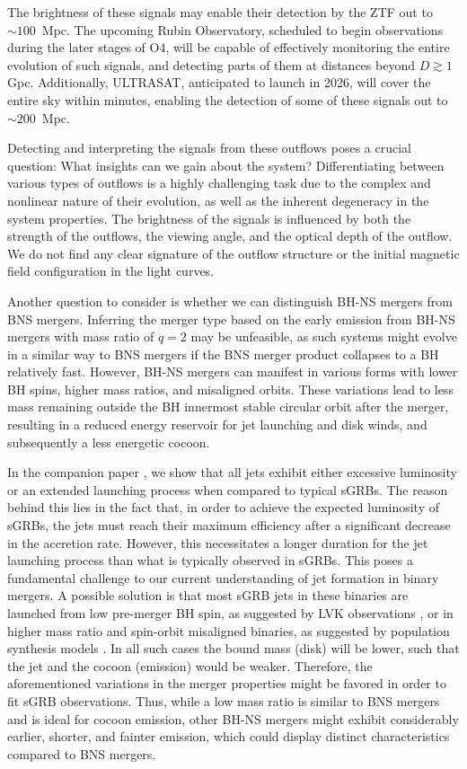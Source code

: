\documentclass[twocolumn,dvipsnames]{aastex62}
\begin{document}
The brightness of these signals may enable their detection by the ZTF out to $ \sim 100 $~Mpc. The upcoming Rubin Observatory, scheduled to begin observations during the later stages of O4, will be capable of effectively monitoring the entire evolution of such signals, and detecting parts of them at distances beyond $D \gtrsim 1$ Gpc. Additionally, ULTRASAT, anticipated to launch in 2026, will cover the entire sky within minutes, enabling the detection of some of these signals out to $ \sim 200$~Mpc.

Detecting and interpreting the signals from these outflows poses a crucial question: What insights can we gain about the system? Differentiating between various types of outflows is a highly challenging task due to the complex and nonlinear nature of their evolution, as well as the inherent degeneracy in the system properties. The brightness of the signals is influenced by both the strength of the outflows, the viewing angle, and the optical depth of the outflow. We do not find any clear signature of the outflow structure or the initial magnetic field configuration in the light curves.

Another question to consider is whether we can distinguish BH-NS mergers from BNS mergers. Inferring the merger type based on the early emission from BH-NS mergers with mass ratio of $ q = 2 $ may be unfeasible, as such systems might evolve in a similar way to BNS mergers if the BNS merger product collapses to a BH relatively fast.
However, BH-NS mergers can manifest in various forms with lower BH spins, higher mass ratios, and misaligned orbits. These variations lead to less mass remaining outside the BH innermost stable circular orbit after the merger, resulting in a reduced energy reservoir for jet launching and disk winds, and subsequently a less energetic cocoon.

In the companion paper \citet{Gottlieb2023}, we show that all jets exhibit either excessive luminosity or an extended launching process when compared to typical sGRBs. The reason behind this lies in the fact that, in order to achieve the expected luminosity of sGRBs, the jets must reach their maximum efficiency after a significant decrease in the accretion rate. However, this necessitates a longer duration for the jet launching process than what is typically observed in sGRBs. This poses a fundamental challenge to our current understanding of jet formation in binary mergers. A possible solution is that most sGRB jets in these binaries are launched from low pre-merger BH spin, as suggested by LVK observations \citep{Abbott2021}, or in higher mass ratio and spin-orbit misaligned binaries, as suggested by population synthesis models \citep{Belczynski2008}. In all such cases the bound mass (disk) will be lower, such that the jet and the cocoon (emission) would be weaker. Therefore, the aforementioned variations in the merger properties might be favored in order to fit sGRB observations. Thus, while a low mass ratio is similar to BNS mergers and is ideal for cocoon emission, other BH-NS mergers might exhibit considerably earlier, shorter, and fainter emission, which could display distinct characteristics compared to BNS mergers.
\end{document}

